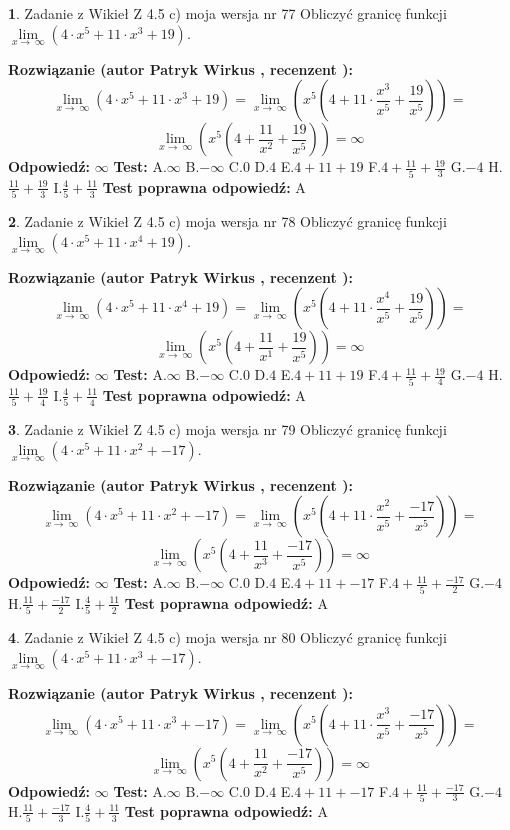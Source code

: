 \documentclass[12pt, a4paper]{article}
\theoremstyle{definition} %
\newtheorem{zad}{}
\newcommand{\zadStart}[1]{\begin{zad}#1\newline}
\newcommand{\zadStop}{\end{zad}}
\newcommand{\rozwStart}[2]{\noindent \textbf{Rozwiązanie (autor #1 , recenzent #2): }\newline}
\newcommand{\rozwStop}{\newline}
\newcommand{\odpStart}{\noindent \textbf{Odpowiedź:}\newline}
\newcommand{\odpStop}{\newline}
\newcommand{\testStart}{\noindent \textbf{Test:}\newline}
\newcommand{\testStop}{\newline}
\newcommand{\kluczStart}{\noindent \textbf{Test poprawna odpowiedź:}\newline}
\newcommand{\kluczStop}{\newline}
\begin{document}
\zadStart{Zadanie z Wikieł Z 4.5 c) moja wersja nr 77}
Obliczyć granicę funkcji  $\lim\limits_{x\to\ \infty}(4 \cdot x^{5}+11 \cdot x^{3}+19)$.
\zadStop
\rozwStart{Patryk Wirkus}{}
$$\lim\limits_{x\to\ \infty}(4 \cdot x^{5}+11 \cdot x^{3}+19) = \lim\limits_{x\to\ \infty}(x^{5}(4 +11 \cdot \frac{x^{3}}{x^{5}}+\frac{19}{x^{5}})) =$$ $$\lim\limits_{x\to\ \infty}(x^{5}(4 +\frac{11}{x^{2}}+\frac{19}{x^{5}})) =\infty$$
\rozwStop
\odpStart
$\infty$
\odpStop
\testStart
A.$\infty$ B.$-\infty$ C.$0$ D.$4$ E.$4 + 11 + 19$
F.$4+\frac{11}{5}+\frac{19}{3}$ G.$-4$
H.$\frac{11}{5}+\frac{19}{3}$
I.$\frac{4}{5}+\frac{11}{3}$
\testStop
\kluczStart
A
\kluczStop



\zadStart{Zadanie z Wikieł Z 4.5 c) moja wersja nr 78}
Obliczyć granicę funkcji  $\lim\limits_{x\to\ \infty}(4 \cdot x^{5}+11 \cdot x^{4}+19)$.
\zadStop
\rozwStart{Patryk Wirkus}{}
$$\lim\limits_{x\to\ \infty}(4 \cdot x^{5}+11 \cdot x^{4}+19) = \lim\limits_{x\to\ \infty}(x^{5}(4 +11 \cdot \frac{x^{4}}{x^{5}}+\frac{19}{x^{5}})) =$$ $$\lim\limits_{x\to\ \infty}(x^{5}(4 +\frac{11}{x^{1}}+\frac{19}{x^{5}})) =\infty$$
\rozwStop
\odpStart
$\infty$
\odpStop
\testStart
A.$\infty$ B.$-\infty$ C.$0$ D.$4$ E.$4 + 11 + 19$
F.$4+\frac{11}{5}+\frac{19}{4}$ G.$-4$
H.$\frac{11}{5}+\frac{19}{4}$
I.$\frac{4}{5}+\frac{11}{4}$
\testStop
\kluczStart
A
\kluczStop



\zadStart{Zadanie z Wikieł Z 4.5 c) moja wersja nr 79}
Obliczyć granicę funkcji  $\lim\limits_{x\to\ \infty}(4 \cdot x^{5}+11 \cdot x^{2}+-17)$.
\zadStop
\rozwStart{Patryk Wirkus}{}
$$\lim\limits_{x\to\ \infty}(4 \cdot x^{5}+11 \cdot x^{2}+-17) = \lim\limits_{x\to\ \infty}(x^{5}(4 +11 \cdot \frac{x^{2}}{x^{5}}+\frac{-17}{x^{5}})) =$$ $$\lim\limits_{x\to\ \infty}(x^{5}(4 +\frac{11}{x^{3}}+\frac{-17}{x^{5}})) =\infty$$
\rozwStop
\odpStart
$\infty$
\odpStop
\testStart
A.$\infty$ B.$-\infty$ C.$0$ D.$4$ E.$4 + 11 + -17$
F.$4+\frac{11}{5}+\frac{-17}{2}$ G.$-4$
H.$\frac{11}{5}+\frac{-17}{2}$
I.$\frac{4}{5}+\frac{11}{2}$
\testStop
\kluczStart
A
\kluczStop



\zadStart{Zadanie z Wikieł Z 4.5 c) moja wersja nr 80}
Obliczyć granicę funkcji  $\lim\limits_{x\to\ \infty}(4 \cdot x^{5}+11 \cdot x^{3}+-17)$.
\zadStop
\rozwStart{Patryk Wirkus}{}
$$\lim\limits_{x\to\ \infty}(4 \cdot x^{5}+11 \cdot x^{3}+-17) = \lim\limits_{x\to\ \infty}(x^{5}(4 +11 \cdot \frac{x^{3}}{x^{5}}+\frac{-17}{x^{5}})) =$$ $$\lim\limits_{x\to\ \infty}(x^{5}(4 +\frac{11}{x^{2}}+\frac{-17}{x^{5}})) =\infty$$
\rozwStop
\odpStart
$\infty$
\odpStop
\testStart
A.$\infty$ B.$-\infty$ C.$0$ D.$4$ E.$4 + 11 + -17$
F.$4+\frac{11}{5}+\frac{-17}{3}$ G.$-4$
H.$\frac{11}{5}+\frac{-17}{3}$
I.$\frac{4}{5}+\frac{11}{3}$
\testStop
\kluczStart
A
\kluczStop
\end{document}
